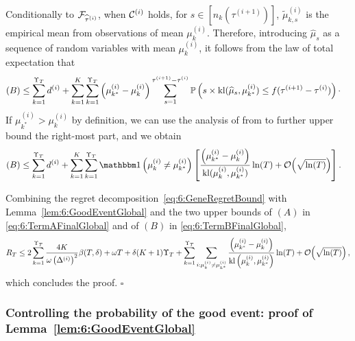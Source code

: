Conditionally to $\mathcal{F}_{\widehat{\tau}^{(i)}}$, when $\mathcal{C}^{(i)}$ holds, for $s \in [n_k(\tau^{(i+1)})]$, $\widetilde{\mu}_{k,s}^{(i)}$ is the empirical mean from \iid{} observations of mean $\mu_k^{(i)}$.
Therefore, introducing $\widehat{\mu}_s$ as a sequence of \iid{} random variables with mean $\mu_k^{(i)}$, it follows from the law of total expectation that
\begin{align*}
    (B)& \leq \sum_{k=1}^{\Upsilon_T}d^{(i)}+\sum_{k=1}^K\sum_{k=1}^{\Upsilon_T}\left(\mu_{k^*}^{(i)} - \mu_k^{(i)}\right) \sum_{s=1}^{\tau^{(i+1)}-\tau^{(i)}}\mathbb{P}\left(s \times \mathrm{kl}(\widehat{\mu}_{s}, \mu_{k^*}^{(i)}) \leq f(\tau^{(i+1)} - \tau^{(i)})\right)\cdot
\end{align*}
%
If $\mu_{k^*}^{(i)} > \mu_k^{(i)}$ by definition, we can use the analysis of \klUCB{} from \cite{KLUCBJournal} to further upper bound the right-most part, and we obtain
%
\begin{align}\label{eq:6:TermBFinalGlobal}
    (B) & \leq \sum_{k=1}^{\Upsilon_T}d^{(i)}+\sum_{k=1}^K\sum_{k=1}^{\Upsilon_T}\indic\left(\mu_k^{(i)} \neq \mu_{k^*}^{(i)}\right)\left[ \frac{\left(\mu_{k^*}^{(i)} - \mu_k^{(i)}\right)}{\kl(\mu_k^{(i)},\mu_{k^*}^{(i)})}\log(T) + \bigO{\sqrt{\log(T)}}\right].
\end{align}

Combining the regret decomposition~\eqref{eq:6:GeneRegretBound} with Lemma~\ref{lem:6:GoodEventGlobal} and the two upper bounds of $(A)$ in \eqref{eq:6:TermAFinalGlobal} and of $(B)$ in \eqref{eq:6:TermBFinalGlobal},
\[R_T \leq 2\sum_{k=1}^{\Upsilon_T} \frac{4K}{\omega \left(\Delta^{(i)}\right)^2}\beta(T,\delta) +\omega T + \delta (K+1)\Upsilon_T  + \sum_{k=1}^{\Upsilon_T}\sum_{i : \mu_k^{(i)} \neq \mu_{k^*}^{(i)}} \frac{\left( \mu_{k^*}^{(i)}-\mu_k^{(i)}\right)}{\mathrm{kl}\left(\mu_k^{(i)},\mu_{k^*}^{(i)}\right)}\ln(T) + \mathop{}\mathopen{}\mathcal{O}\mathopen{}\left(\sqrt{\ln(T)}\right),\]
which concludes the proof.
%
\hfill{}$\square$

\subsubsection{Controlling the probability of the good event: proof of Lemma~\ref{lem:6:GoodEventGlobal}}


